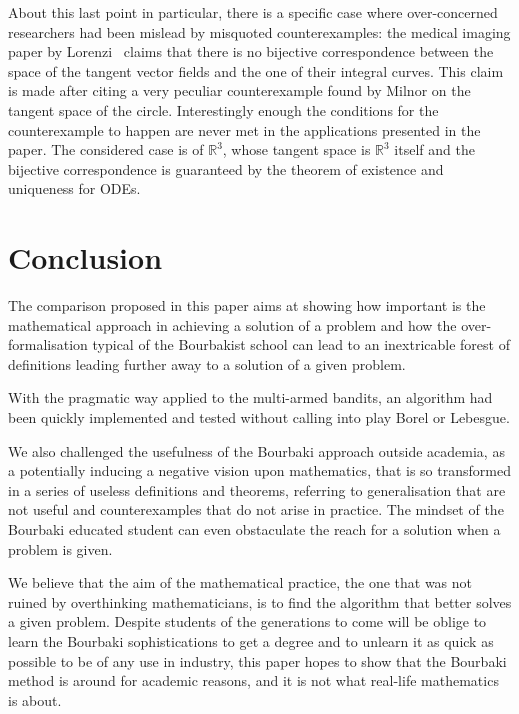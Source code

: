 \documentclass[]{scrartcl}
\theoremstyle{definition}
\begin{document}
About this last point in particular, there is a specific case where over-concerned researchers had been mislead by misquoted counterexamples: the medical imaging paper by Lorenzi~\cite{lorenzi2013geodesics} claims that there is no bijective correspondence between the space of the tangent vector fields and the one of their integral curves. This claim is made after citing a very peculiar counterexample found by Milnor on the tangent space of the circle.
Interestingly enough the conditions for the counterexample to happen are never met in the applications presented in the paper. The considered case is of $\mathbb{R}^3$, whose tangent space is $\mathbb{R}^3$ itself and the bijective correspondence is guaranteed by the theorem of existence and uniqueness for ODEs.


\section{Conclusion}

The comparison proposed in this paper aims at showing how important is the mathematical approach in achieving a solution of a problem and how the over-formalisation typical of the Bourbakist school can lead to an inextricable forest of definitions leading further away to a solution of a given problem.

With the pragmatic way applied to the multi-armed bandits, an algorithm had been quickly implemented and tested without calling into play Borel or Lebesgue.

We also challenged the usefulness of the Bourbaki approach outside academia, as a potentially inducing a negative vision upon mathematics, that is so transformed in a series of useless definitions and theorems, referring to generalisation that are not useful and counterexamples that do not arise in practice. The mindset of the Bourbaki educated student can even obstaculate the reach for a solution when a problem is given.

We believe that the aim of the mathematical practice, the one that was not ruined by overthinking mathematicians, is to find the algorithm that better solves a given problem. Despite students of the generations to come will be oblige to learn the Bourbaki sophistications to get a degree and to unlearn it as quick as possible to be of any use in industry, this paper hopes to show that the Bourbaki method is around for academic reasons, and it is not what real-life mathematics is about.

 

\end{document}
